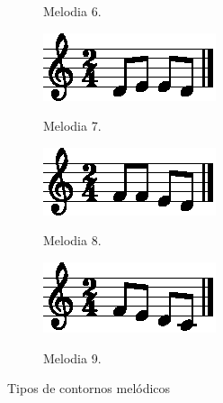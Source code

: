 \begin{figure}[!h]
\begin{subfigure}[b]{0.3\textwidth}
         \caption{Melodia 6.}
         \label{fig:melodia-chars-shape-6-1}
     \end{subfigure}
     \hfill
     \begin{subfigure}[b]{0.3\textwidth}
         \centering
         \href{https://drive.google.com/file/d/1jRZEfsaEXEPIDIarktZA7FK0dQ8xE4B0/view?usp=sharing}{\includegraphics[width=\textwidth]{chapters/cap-musicalidade-percepcion/melodia-chars-shape-7-1.eps}}
         \caption{Melodia 7.}
         \label{fig:melodia-chars-shape-7-1}
     \end{subfigure}
     \hfill
     \begin{subfigure}[b]{0.3\textwidth}
         \centering
         \href{https://drive.google.com/file/d/11SZQvNkkYqM6qyZblaxMEV1fB0ysIlxH/view?usp=sharing}{\includegraphics[width=\textwidth]{chapters/cap-musicalidade-percepcion/melodia-chars-shape-8-1.eps}}
         \caption{Melodia 8.}
         \label{fig:melodia-chars-shape-8-1}
     \end{subfigure}
     \hfill
     \begin{subfigure}[b]{0.3\textwidth}
         \centering
         \href{https://drive.google.com/file/d/1gX_eJdsTBCEY2PBFP7ZS6HIeqgw-p-Ut/view?usp=sharing}{\includegraphics[width=\textwidth]{chapters/cap-musicalidade-percepcion/melodia-chars-shape-9-1.eps}}
         \caption{Melodia 9.}
         \label{fig:melodia-chars-shape-9-1}
     \end{subfigure}
     \hfill
        \caption{Tipos de contornos melódicos}
        \label{fig:9melodias}
\end{figure}



